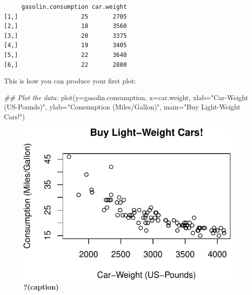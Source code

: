 \documentclass[
  letterpaper,
  DIV=11,
  numbers=noendperiod]{scrreprt}
\newenvironment{Shaded}{\begin{snugshade}}{\end{snugshade}}
\newcommand{\AttributeTok}[1]{\textcolor[rgb]{0.40,0.45,0.13}{#1}}
\newcommand{\DocumentationTok}[1]{\textcolor[rgb]{0.37,0.37,0.37}{\textit{#1}}}
\newcommand{\FunctionTok}[1]{\textcolor[rgb]{0.28,0.35,0.67}{#1}}
\newcommand{\NormalTok}[1]{\textcolor[rgb]{0.00,0.23,0.31}{#1}}
\newcommand{\StringTok}[1]{\textcolor[rgb]{0.13,0.47,0.30}{#1}}
\theoremstyle{definition}
\theoremstyle{plain}
\theoremstyle{plain}
\theoremstyle{remark}
\begin{document}
\begin{verbatim}
     gasolin.consumption car.weight
[1,]                  25       2705
[2,]                  18       3560
[3,]                  20       3375
[4,]                  19       3405
[5,]                  22       3640
[6,]                  22       2880
\end{verbatim}

\hfill\break

This is how you can produce your first plot:

\begin{Shaded}
\begin{Highlighting}[]
\DocumentationTok{\#\# Plot the data:}
\FunctionTok{plot}\NormalTok{(}\AttributeTok{y=}\NormalTok{gasolin.consumption, }\AttributeTok{x=}\NormalTok{car.weight, }
     \AttributeTok{xlab=}\StringTok{"Car{-}Weight (US{-}Pounds)"}\NormalTok{, }
     \AttributeTok{ylab=}\StringTok{"Consumption (Miles/Gallon)"}\NormalTok{, }
     \AttributeTok{main=}\StringTok{"Buy Light{-}Weight Cars!"}\NormalTok{)}
\end{Highlighting}
\end{Shaded}

\begin{figure}[H]

{\centering \includegraphics{./01-Introduction-to-R_files/figure-pdf/fig-margin-1.pdf}

}

\caption{\label{fig-margin}\textbf{?(caption)}}

\end{figure}

\hfill\break
\end{document}
